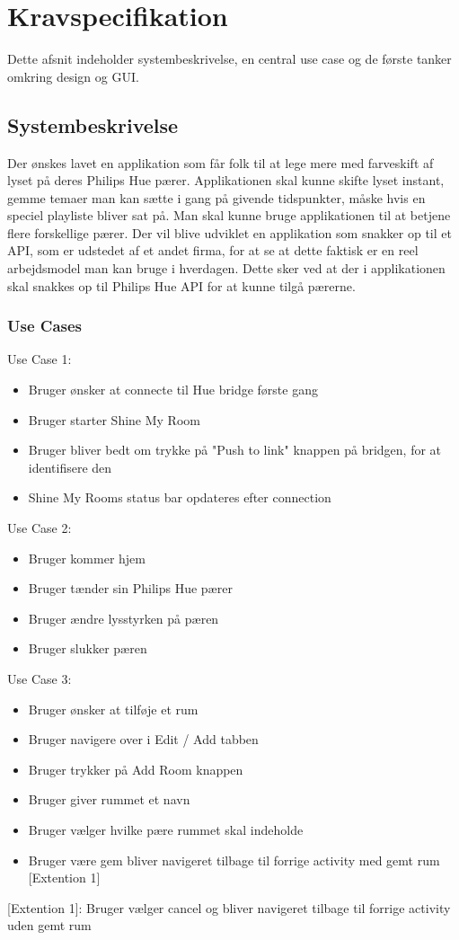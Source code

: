 	\chapter{Kravspecifikation}
	Dette afsnit indeholder systembeskrivelse, en central use case og de første tanker omkring design og GUI. \\
	
		\section{Systembeskrivelse}
		Der ønskes lavet en applikation som får folk til at lege mere med farveskift af lyset på deres Philips Hue pærer.
		Applikationen skal kunne skifte lyset instant, gemme temaer man kan sætte i gang på givende tidspunkter, måske hvis en speciel playliste bliver sat på. Man skal kunne bruge applikationen til at betjene flere forskellige pærer.
		Der vil blive udviklet en applikation som snakker op til et API, som er udstedet af et andet firma, for at se at dette faktisk er en reel arbejdsmodel man kan bruge i hverdagen.
		Dette sker ved at der i applikationen skal snakkes op til Philips Hue API for at kunne tilgå pærerne.
		\newline
		
		\subsection{Use Cases}
		Use Case 1:
		\begin{itemize}
			\item Bruger ønsker at connecte til Hue bridge første gang
			\item Bruger starter Shine My Room
			\item Bruger bliver bedt om trykke på "Push to link" knappen på bridgen, for at identifisere den
			\item Shine My Rooms status bar opdateres efter connection
		\end{itemize}
		
		Use Case 2:
		\begin{itemize}
			\item Bruger kommer hjem
			\item Bruger tænder sin Philips Hue pærer
			\item Bruger ændre lysstyrken på pæren
			\item Bruger slukker pæren
		\end{itemize}
	
		Use Case 3:
		\begin{itemize}
			\item Bruger ønsker at tilføje et rum
			\item Bruger navigere over i Edit / Add tabben
			\item Bruger trykker på Add Room knappen
			\item Bruger giver rummet et navn
			\item Bruger vælger hvilke pære rummet skal indeholde
			\item Bruger være gem bliver navigeret tilbage til forrige activity med gemt rum [Extention 1]
		\end{itemize}
		[Extention 1]: Bruger vælger cancel og bliver navigeret tilbage til forrige activity uden gemt rum
		\newpage
		

